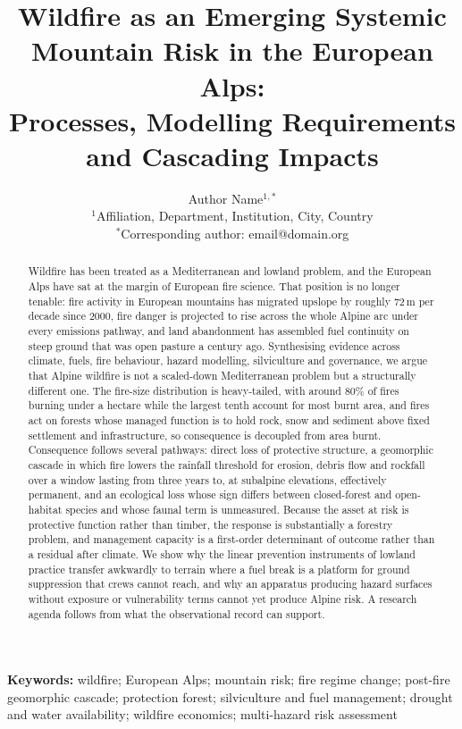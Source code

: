 \documentclass[11pt,a4paper]{article}
\title{
Wildfire as an Emerging Systemic Mountain Risk in the European Alps:\\
Processes, Modelling Requirements and Cascading Impacts
}
\author{
Author Name$^{1,*}$ \\
\small $^{1}$Affiliation, Department, Institution, City, Country \\
\small $^{*}$Corresponding author: email@domain.org
}
\date{}
\begin{document}
\maketitle


\begin{abstract}
\noindent
Wildfire has been treated as a Mediterranean and lowland problem, and the European Alps have sat at the margin of European fire science. That position is no longer tenable: fire activity in European mountains has migrated upslope by roughly 72\,m per decade since 2000, fire danger is projected to rise across the whole Alpine arc under every emissions pathway, and land abandonment has assembled fuel continuity on steep ground that was open pasture a century ago. Synthesising evidence across climate, fuels, fire behaviour, hazard modelling, silviculture and governance, we argue that Alpine wildfire is not a scaled-down Mediterranean problem but a structurally different one. The fire-size distribution is heavy-tailed, with around 80\% of fires burning under a hectare while the largest tenth account for most burnt area, and fires act on forests whose managed function is to hold rock, snow and sediment above fixed settlement and infrastructure, so consequence is decoupled from area burnt. Consequence follows several pathways: direct loss of protective structure, a geomorphic cascade in which fire lowers the rainfall threshold for erosion, debris flow and rockfall over a window lasting from three years to, at subalpine elevations, effectively permanent, and an ecological loss whose sign differs between closed-forest and open-habitat species and whose faunal term is unmeasured. Because the asset at risk is protective function rather than timber, the response is substantially a forestry problem, and management capacity is a first-order determinant of outcome rather than a residual after climate. We show why the linear prevention instruments of lowland practice transfer awkwardly to terrain where a fuel break is a platform for ground suppression that crews cannot reach, and why an apparatus producing hazard surfaces without exposure or vulnerability terms cannot yet produce Alpine risk. A research agenda follows from what the observational record can support.
\end{abstract}

\noindent\textbf{Keywords:}
wildfire; European Alps; mountain risk; fire regime change; post-fire geomorphic cascade; protection forest; silviculture and fuel management; drought and water availability; wildfire economics; multi-hazard risk assessment
\end{document}
